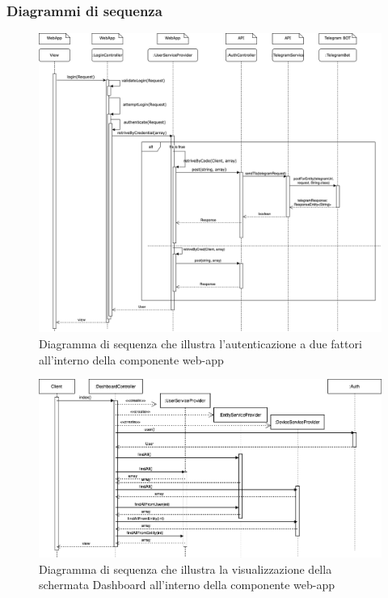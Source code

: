 \begin{landscape}
	\subsubsection{Diagrammi di sequenza}
		\begin{figure}[H]
			\centering
			\includegraphics[scale=0.500]{res/images/WEBAPP/AutenticazioneTfa.png}
			\caption{Diagramma di sequenza che illustra l'autenticazione a due fattori all'interno della componente web-app}
		\end{figure}
		\begin{figure}[H]
			\centering
			\includegraphics[scale=0.600]{res/images/WEBAPP/Dashboard.index.png}
			\caption{Diagramma di sequenza che illustra la visualizzazione della schermata Dashboard all'interno della componente web-app}
		\end{figure}
	\end{landscape}